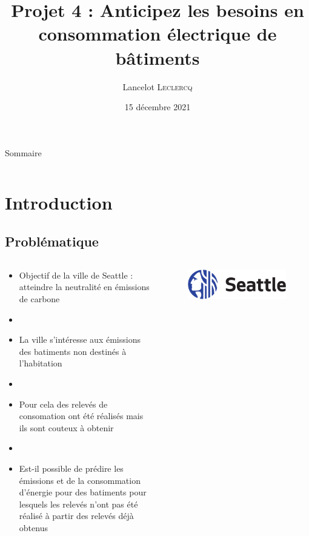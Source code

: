 \documentclass[8pt,aspectratio=169,hyperref={unicode=true}]{beamer}
\title[Anticipez les besoins en consommation électrique de bâtiments]
{Projet 4 : Anticipez les besoins en consommation électrique de bâtiments}
\author[Lancelot \textsc{Leclercq}]{Lancelot \textsc{Leclercq}}
\institute[]{}
\date[]{\small{15 décembre 2021}}
\begin{document}
\begin{frame}[plain]
  \titlepage
\end{frame}

\begin{frame}{Sommaire}
  \Large
  \begin{columns}
    \begin{column}{.7\textwidth}
      \tableofcontents[hideallsubsections]
    \end{column}
  \end{columns}
\end{frame}


\section{Introduction}
\subsection{Problématique}
\begin{frame}{\insertsubsection}
  \begin{columns}
    \begin{column}{.6\textwidth}
      \begin{itemize}
        \item Objectif de la ville de Seattle : atteindre la neutralité en émissions
              de carbone
        \item[]
        \item La ville s'intéresse aux émissions des batiments non destinés
              à l'habitation
        \item[]
        \item Pour cela des relevés de consomation ont été réalisés mais ils sont
              couteux à obtenir
        \item[]
        \item Est-il possible de prédire les émissions et de la consommation d'énergie
              pour des batiments pour lesquels les relevés n'ont pas été réalisé à partir
              des relevés déjà obtenus
      \end{itemize}
    \end{column}
    \begin{column}{.4\textwidth}
      \begin{figure}
        \includegraphics[width=.8\textwidth]{./Seattle_logo_landscape_blue-black.pdf}
      \end{figure}
    \end{column}
  \end{columns}
\end{frame}
\end{document}
